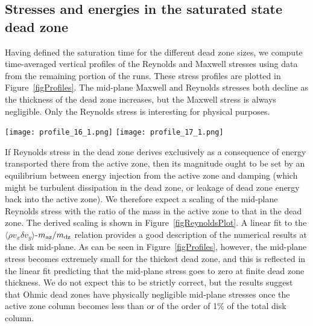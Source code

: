\subsection{Stresses and energies in the saturated state dead zone}
Having defined the saturation time for the different dead zone sizes, we compute time-averaged vertical profiles 
of the Reynolds and Maxwell stresses using data from the remaining portion of the runs. These stress profiles are plotted in Figure~\ref{figProfiles}. The mid-plane Maxwell and 
Reynolds stresses both decline as the thickness of the dead zone increases, but the Maxwell stress is always 
negligible. Only the Reynolds stress is interesting for physical purposes.

\begin{figure*}[p]
\centering
\texttt{[image: profile\_16\_1.png]}
\texttt{[image: profile\_17\_1.png]}
\caption{Time averaged vertical profiles of the Reynolds stress (left) and Maxwell stress (right) for the different sized dead zones.  The sharp transition seen near $|z|=3$ in the Reynolds stress for the ML and L runs corresponds to where the r modes (discussed in detail in section 3.8) shut off.  The r modes have a larger spatial extent in the ML and L runs due to the larger dead zone.  Therefore the location of the transition feature happens in a region of lower Reynolds stress, making the features most prominent in these runs. }
\label{figProfiles}
\end{figure*}

If Reynolds stress in the dead zone derives exclusively as a consequence of energy transported there from the 
active zone, then its magnitude ought to be set by an equilibrium between energy injection from the active zone 
and damping (which might be turbulent dissipation in the dead zone, or leakage of dead zone energy back 
into the active zone). We therefore expect a scaling of the mid-plane Reynolds stress with the ratio of the mass 
in the active zone to that in the dead zone. The derived scaling is shown in Figure~\ref{figReynoldsPlot}. A linear 
fit to the $\langle \rho v_x \delta v_y \rangle$-$m_{\rm az} / m_{\rm dz}$ relation provides a good description of the numerical results at the disk mid-plane. As can be seen in Figure~\ref{figProfiles}, however, the mid-plane stress becomes 
extremely small for the thickest dead zone, and this is reflected in the linear fit predicting that the mid-plane 
stress goes to zero at finite dead zone thickness. We do not expect this to be strictly correct, but the results 
suggest that Ohmic dead zones have physically negligible mid-plane stresses once the active zone column  
becomes less than or of the order of 1\% of the total disk column.

